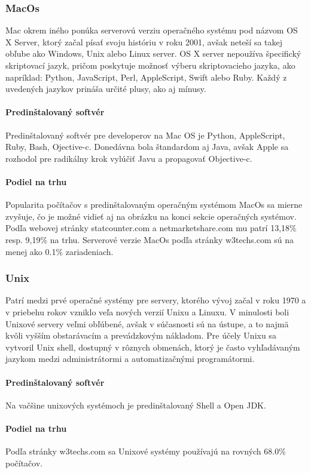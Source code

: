 \subsubsection{MacOs}
\indent  Mac okrem iného ponúka serverovú verziu operačného systému pod názvom OS X Server, ktorý začal písať svoju históriu v roku 2001, avšak neteší sa takej obľube ako Windows, Unix alebo Linux server. OS X server nepoužíva  špecifický skriptovací jazyk, pričom poskytuje možnosť výberu skriptovacieho jazyka, ako napríklad: Python, JavaScript, Perl, AppleScript, Swift alebo Ruby. Každý z uvedených jazykov prináša určité plusy, ako aj mínusy.
\paragraph{Predinštalovaný softvér}
\indent Predinštalovaný softvér pre developerov na Mac OS je Python, AppleScript, Ruby, Bash, Ojective-c. Donedávna bola štandardom aj Java, avšak Apple sa rozhodol pre radikálny krok vylúčiť Javu a propagovať Objective-c.
\paragraph{Podiel na trhu}
\indent Popularita počítačov s predinštalovaným operačným systémom MacOs sa mierne zvyšuje, čo je možné vidieť aj na obrázku na konci sekcie operačných systémov. Podľa webovej stránky statcounter.com\cite{statcounter} a netmarketshare.com\cite{netmarketshare} mu patrí 13,18\% resp.  9,19\% na trhu.
\indent Serverové verzie MacOs podľa stránky w3techs.com\cite{pop} sú na menej ako 0.1\% zariadeniach.
\subsubsection{Unix}
\indent Patrí medzi prvé operačné systémy pre servery, ktorého vývoj začal v roku 1970 a v priebehu rokov vzniklo veľa nových verzií Unixu a Linuxu. V minulosti boli Unixové servery veľmi obľúbené, avšak v súčasnosti sú na ústupe, a to najmä kvôli vyšším obstarávacím a prevádzkovým nákladom. Pre účely Unixu sa vytvoril Unix shell, dostupný v rôznych obmenách, ktorý je často vyhľadávaným jazykom medzi administrátormi a automatizačnými programátormi.
\paragraph{Predinštalovaný softvér}
\indent Na vačšine unixových systémoch je predinštalovaný Shell a Open JDK.
\paragraph{Podiel na trhu}
\indent Podľa stránky w3techs.com\cite{pop} sa Unixové systémy používajú na rovných 68.0\% počítačov.
